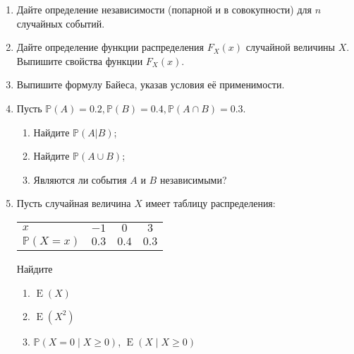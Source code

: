 \documentclass[12pt]{article}
\DeclareMathOperator{\E}{E}
\def \P{\mathbb{P}}
\begin{document}
\begin{enumerate}
\item Дайте определение независимости (попарной и в совокупности) для $n$ случайных событий.
\item Дайте определение функции распределения $F_{X}(x)$ случайной величины $X$. 
Выпишите свойства функции $F_{X}(x)$. 
\item Выпишите формулу Байеса, указав условия её применимости.

\item  Пусть $\P(A) = 0.2, \P(B) = 0.4, \P(A\cap B) = 0.3$.
\begin{enumerate}
  \item  Найдите $\P(A|B)$;
  \item  Найдите $\P(A\cup B)$;
  \item  Являются ли события $A$ и $B$ независимыми?
\end{enumerate}

\item  Пусть случайная величина $X$ имеет таблицу распределения: %

\begin{tabular}{lccc}
\toprule
$x$ & $-1$  & $0$  & $3$ \\
$\P(X = x)$ & $0.3$ & $0.4$  & $0.3$ \\
\bottomrule
\end{tabular}

Найдите
\begin{enumerate}
	\item $\E(X)$
	\item $\E\left(X^2\right)$
	\item $\P(X=0 \mid X \geq 0)$, $\E(X \mid X \geq 0)$
\end{enumerate}

\end{enumerate}
\end{document}
